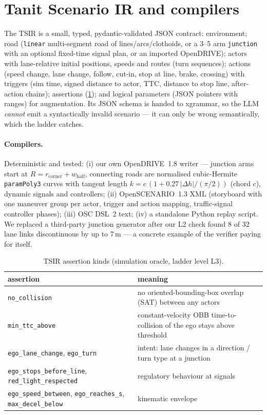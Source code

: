 \documentclass[10pt,a4paper]{article}
\begin{document}
\section{Tanit Scenario IR and compilers}
The TSIR is a small, typed, pydantic-validated JSON contract: environment; road (\texttt{linear} multi-segment
road of lines/arcs/clothoids, or a 3--5 arm \texttt{junction} with an optional fixed-time signal plan, or an
imported OpenDRIVE); actors with lane-relative initial positions, speeds and routes (turn sequences);
actions (speed change, lane change, follow, cut-in, stop at line, brake, crossing) with triggers (sim time,
signed distance to actor, TTC, distance to stop line, after-action chains); assertions (\cref{tab:assert});
and logical parameters (JSON pointers with ranges) for augmentation. Its JSON schema is handed to xgrammar,
so the LLM \emph{cannot} emit a syntactically invalid scenario --- it can only be wrong semantically, which
the ladder catches.

\paragraph{Compilers.} Deterministic and tested: (i) our own OpenDRIVE~1.8 writer --- junction arms start at
$R = r_\text{corner} + w_\text{half}$, connecting roads are normalised cubic-Hermite \texttt{paramPoly3}
curves with tangent length $k = c\,(1 + 0.27\,|\Delta h| / (\pi/2))$ (chord $c$), dynamic signals and
controllers; (ii) OpenSCENARIO~1.3 XML (storyboard with one maneuver group per actor, trigger and action
mapping, traffic-signal controller phases); (iii) OSC DSL~2 text; (iv) a standalone Python replay script.
We replaced a third-party junction generator after our L2 check found 8 of 32 lane links discontinuous by
up to 7\,m --- a concrete example of the verifier paying for itself.

\begin{table}[h]\centering\small
\caption{TSIR assertion kinds (simulation oracle, ladder level L3).}\label{tab:assert}
\begin{tabular}{@{}ll@{}}\toprule
assertion & meaning \\\midrule
\texttt{no\_collision} & no oriented-bounding-box overlap (SAT) between any actors\\
\texttt{min\_ttc\_above} & constant-velocity OBB time-to-collision of the ego stays above threshold\\
\texttt{ego\_lane\_change}, \texttt{ego\_turn} & intent: lane changes in a direction / turn type at a junction\\
\texttt{ego\_stops\_before\_line}, \texttt{red\_light\_respected} & regulatory behaviour at signals\\
\texttt{ego\_speed\_between}, \texttt{ego\_reaches\_s}, \texttt{max\_decel\_below} & kinematic envelope\\\bottomrule
\end{tabular}
\end{table}
\end{document}
